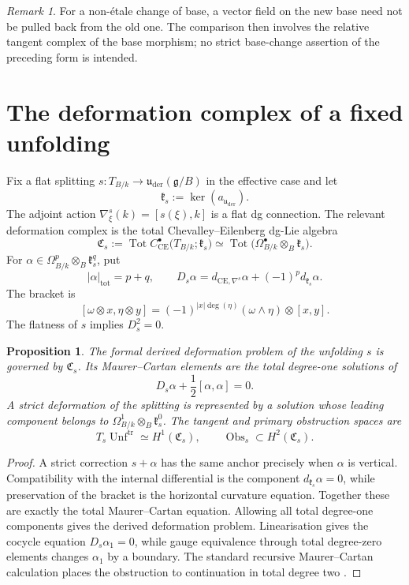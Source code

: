 \documentclass[11pt,reqno,a4paper,dvipsnames,x11names]{amsart}
\numberwithin{equation}{section}
\theoremstyle{plain}
\newtheorem{proposition}[theorem]{Proposition}
\theoremstyle{definition}
\theoremstyle{remark}
\newtheorem{remark}[theorem]{Remark}
\DeclareMathOperator{\Tot}{Tot}
\newcommand{\kk}{k}
\newcommand{\g}{\mathfrak g}
\newcommand{\kfr}{\mathfrak k}
\newcommand{\uuder}{\mathfrak u_{\mathrm{der}}}
\newcommand{\tr}{\mathrm{tr}}
\newcommand{\from}{\colon}
\begin{document}
\begin{remark}
For a non-\'etale change of base, a vector field on the new base need not be pulled back from the old one. The comparison then involves the relative tangent complex of the base morphism; no strict base-change assertion of the preceding form is intended.
\end{remark}


\section{The deformation complex of a fixed unfolding}\label{sec:def-complex}

Fix a flat splitting
\(s\from T_{B/\kk}\to\uuder(\g/B)\) in the effective case and let
\[
 \kfr_s:=\ker(a_{\uuder}).
\]
The adjoint action
\(\nabla^s_\xi(k)=[s(\xi),k]\) is a flat dg connection. The relevant deformation complex is the total Chevalley--Eilenberg dg-Lie algebra
\[
 \mathfrak C_s
 :=\Tot C^\bullet_{\mathrm{CE}}
 \bigl(T_{B/\kk};\kfr_s\bigr)
 \simeq
 \Tot\bigl(\Omega^\bullet_{B/\kk}\otimes_B\kfr_s\bigr).
\]
For \(\alpha\in\Omega^p_{B/\kk}\otimes_B\kfr_s^q\), put
\[
 |\alpha|_{\mathrm{tot}}=p+q,
 \qquad
 D_s\alpha
 =d_{\mathrm{CE},\nabla^s}\alpha
  +(-1)^p d_{\kfr_s}\alpha.
\]
The bracket is
\[
 [\omega\otimes x,\eta\otimes y]
 =(-1)^{|x|\deg(\eta)}
  (\omega\wedge\eta)\otimes[x,y].
\]
The flatness of \(s\) implies \(D_s^2=0\).

\begin{proposition}\label{prop:MC-def}
The formal derived deformation problem of the unfolding \(s\) is governed by \(\mathfrak C_s\). Its Maurer--Cartan elements are the total degree-one solutions of
\[
 D_s\alpha+\frac12[\alpha,\alpha]=0.
\]
A strict deformation of the splitting is represented by a solution whose leading component belongs to
\(\Omega^1_{B/\kk}\otimes_B\kfr_s^0\). The tangent and primary obstruction spaces are
\[
 T_s\operatorname{Unf}^{\tr}\simeq H^1(\mathfrak C_s),
 \qquad
 \operatorname{Obs}_s\subset H^2(\mathfrak C_s).
\]
\end{proposition}

\begin{proof}
A strict correction \(s+\alpha\) has the same anchor precisely when \(\alpha\) is vertical. Compatibility with the internal differential is the component
\(d_{\kfr_s}\alpha=0\), while preservation of the bracket is the horizontal curvature equation. Together these are exactly the total Maurer--Cartan equation. Allowing all total degree-one components gives the derived deformation problem. Linearisation gives the cocycle equation \(D_s\alpha_1=0\), while gauge equivalence through total degree-zero elements changes \(\alpha_1\) by a boundary. The standard recursive Maurer--Cartan calculation places the obstruction to continuation in total degree two \cite{Hinich01,Pridham10}.
\end{proof}
\end{document}
